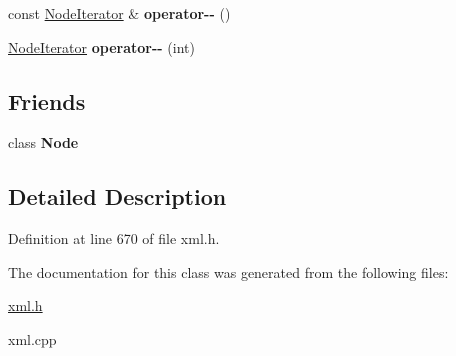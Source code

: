 \begin{DoxyCompactItemize}
\item 
\hypertarget{classphys_1_1xml_1_1NodeIterator_a9d0ace0a01c3ea0a0ff2ed389b4a5141}{
const \hyperlink{classphys_1_1xml_1_1NodeIterator}{NodeIterator} \& {\bfseries operator-\/-\/} ()}
\label{da/d4f/classphys_1_1xml_1_1NodeIterator_a9d0ace0a01c3ea0a0ff2ed389b4a5141}

\item 
\hypertarget{classphys_1_1xml_1_1NodeIterator_a4775254b1fbfc2e10a6024241be55f6a}{
\hyperlink{classphys_1_1xml_1_1NodeIterator}{NodeIterator} {\bfseries operator-\/-\/} (int)}
\label{da/d4f/classphys_1_1xml_1_1NodeIterator_a4775254b1fbfc2e10a6024241be55f6a}

\end{DoxyCompactItemize}
\subsection*{Friends}
\begin{DoxyCompactItemize}
\item 
\hypertarget{classphys_1_1xml_1_1NodeIterator_a6db9d28bd448a131448276ee03de1e6d}{
class {\bfseries Node}}
\label{da/d4f/classphys_1_1xml_1_1NodeIterator_a6db9d28bd448a131448276ee03de1e6d}

\end{DoxyCompactItemize}


\subsection{Detailed Description}


Definition at line 670 of file xml.h.



The documentation for this class was generated from the following files:\begin{DoxyCompactItemize}
\item 
\hyperlink{xml_8h}{xml.h}\item 
xml.cpp\end{DoxyCompactItemize}
